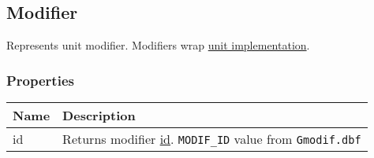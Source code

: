 \subsection{Modifier}
\label{Modifier}
Represents unit modifier. Modifiers wrap \hyperref[UnitImpl]{unit implementation}.
\subsubsection{Properties}
\begin{center}
\begin{tabularx}{\linewidth}{| l | X |}
\hline
\textbf{Name} & \textbf{Description} \\
\hline
id & Returns modifier \hyperref[Id]{id}. \texttt{MODIF\_ID} value from \texttt{Gmodif.dbf}\\
\hline
\end{tabularx}
\end{center}